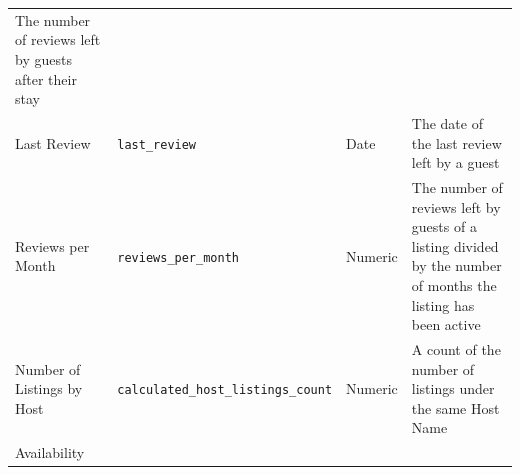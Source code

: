 \documentclass[]{article}
\begin{document}
\begin{longtable}[]{@{}llll@{}}
\begin{minipage}[t]{0.22\columnwidth}
The number of reviews left by guests after their stay\strut
\end{minipage}\tabularnewline
\begin{minipage}[t]{0.22\columnwidth}\raggedright
Last Review\strut
\end{minipage} & \begin{minipage}[t]{0.22\columnwidth}\raggedright
\texttt{last\_review}\strut
\end{minipage} & \begin{minipage}[t]{0.22\columnwidth}\raggedright
Date\strut
\end{minipage} & \begin{minipage}[t]{0.22\columnwidth}\raggedright
The date of the last review left by a guest\strut
\end{minipage}\tabularnewline
\begin{minipage}[t]{0.22\columnwidth}\raggedright
Reviews per Month\strut
\end{minipage} & \begin{minipage}[t]{0.22\columnwidth}\raggedright
\texttt{reviews\_per\_month}\strut
\end{minipage} & \begin{minipage}[t]{0.22\columnwidth}\raggedright
Numeric\strut
\end{minipage} & \begin{minipage}[t]{0.22\columnwidth}\raggedright
The number of reviews left by guests of a listing divided by the number
of months the listing has been active\strut
\end{minipage}\tabularnewline
\begin{minipage}[t]{0.22\columnwidth}\raggedright
Number of Listings by Host\strut
\end{minipage} & \begin{minipage}[t]{0.22\columnwidth}\raggedright
\texttt{calculated\_host\_listings\_count}\strut
\end{minipage} & \begin{minipage}[t]{0.22\columnwidth}\raggedright
Numeric\strut
\end{minipage} & \begin{minipage}[t]{0.22\columnwidth}\raggedright
A count of the number of listings under the same Host Name\strut
\end{minipage}\tabularnewline
\begin{minipage}[t]{0.22\columnwidth}\raggedright
Availability\strut
\end{minipage} & \begin{minipage}[t]{0.22\columnwidth}\raggedright

\end{minipage}
\end{longtable}
\end{document}
